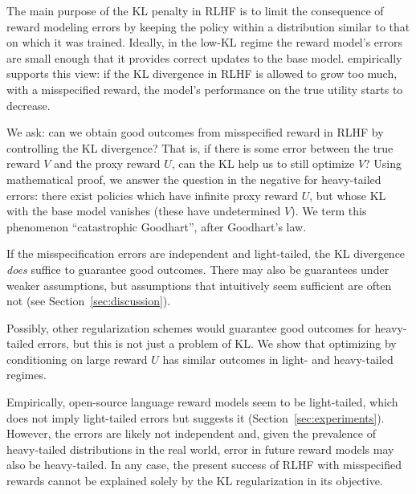 \documentclass{article}
\theoremstyle{plain}
\theoremstyle{definition}
\theoremstyle{remark}
\begin{document}
The main purpose of the KL penalty in RLHF is to limit the consequence of reward modeling errors by keeping the policy within a distribution similar to that on which it was trained. Ideally, in the low-KL regime the reward model's errors are small enough that it provides correct updates to the base model.  empirically supports this view: if the KL divergence in RLHF is allowed to grow too much, with a misspecified reward, the model's performance on the true utility starts to decrease.

We ask: can we obtain good outcomes from misspecified reward in RLHF by controlling the KL divergence? That is, if there is some error between the true reward $V$ and the proxy reward $U$, can the KL help us to still optimize $V$? Using mathematical proof, we answer the question in the negative for heavy-tailed errors: there exist policies which have infinite proxy reward $U$, but whose KL with the base model vanishes (these have undetermined $V$).  We term this phenomenon ``catastrophic Goodhart'', after Goodhart's law.

If the misspecification errors are independent and light-tailed, the KL divergence \emph{does} suffice to guarantee good outcomes. There may also be 
 guarantees under weaker assumptions, but assumptions that intuitively seem sufficient are often not (see Section~\ref{sec:discussion}).

Possibly, other regularization schemes would guarantee good outcomes for heavy-tailed errors, but this is not just a problem of KL. We show that optimizing by conditioning on large reward $U$ has similar outcomes in light- and heavy-tailed regimes.

Empirically, open-source language reward models seem to be light-tailed, which does not imply light-tailed errors but suggests it (Section~\ref{sec:experiments}). However, the errors are likely not independent and, given the prevalence of heavy-tailed distributions in the real world, error in future reward models may also be heavy-tailed. In any case, the present success of RLHF with misspecified rewards cannot be explained solely by the KL regularization in its objective.

\end{document}
